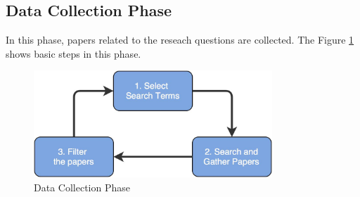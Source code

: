 \subsection{Data Collection Phase}\label{section:context/approach/data_collection_phase}
In this phase, papers related to the reseach questions are collected. The Figure \ref{fig:context/data_collection_phase} shows basic steps in this phase.
\begin{figure}[H]
\begin{center}
\includegraphics[width=0.8\textwidth]{figures/introduction_data_collection_phase}
\caption{Data Collection Phase}
\label{fig:context/data_collection_phase}
\end{center}
\end{figure}

